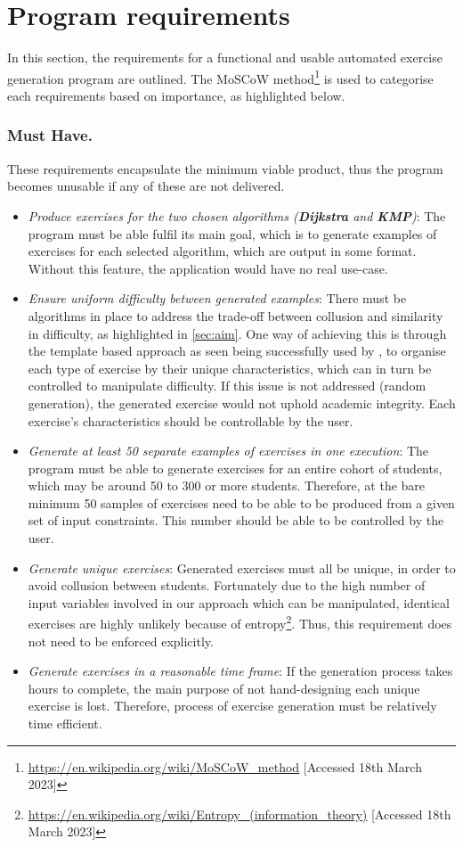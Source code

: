 \documentclass{l4proj}
\begin{document}
\section{Program requirements}

In this section, the requirements for a functional and usable automated exercise generation program are outlined. The MoSCoW method\footnote{\url{https://en.wikipedia.org/wiki/MoSCoW_method} [Accessed 18th March 2023]} is used to categorise each requirements based on importance, as highlighted below.

\subsubsection{Must Have.}

These requirements encapsulate the minimum viable product, thus the program becomes unusable if any of these are not delivered.
\begin{itemize}
	\item
	\emph{Produce exercises for the two chosen algorithms (\textbf{Dijkstra} and \textbf{KMP})}: The program must be able fulfil its main goal, which is to generate examples of exercises for each 		selected algorithm, which are output in some format. Without this feature, the application would have no real use-case. 
	\item
	\emph{Ensure uniform difficulty between generated examples}: There must be algorithms in place to address the trade-off between collusion and similarity in difficulty, as highlighted in \autoref{sec:aim}. One way of achieving this is through the template based approach as seen being successfully used by \cite{Sad12}, to organise each type of exercise by their unique characteristics, which can in turn be controlled to manipulate difficulty. If this issue is not addressed (random generation), the generated exercise would not uphold academic integrity. Each exercise's characteristics should be controllable by the user.
	\item
	\emph{Generate at least 50 separate examples of exercises in one execution}: The program must be able to generate exercises for an entire cohort of students, which may be around 50 to 300 or more students. Therefore, at the bare minimum 50 samples of exercises need to be able to be produced from a given set of input constraints. This number should be able to be controlled by the user.
	\item
	\emph{Generate unique exercises}: Generated exercises must all be unique, in order to avoid collusion between students. Fortunately due to the high number of input variables involved in our approach which can be manipulated, identical exercises are highly unlikely because of entropy\footnote{\url{https://en.wikipedia.org/wiki/Entropy_(information_theory)} [Accessed 18th March 2023]}. Thus, this requirement does not need to be enforced explicitly.
	\item
	\emph{Generate exercises in a reasonable time frame}: If the generation process takes hours to complete, the main purpose of not hand-designing each unique exercise is lost. Therefore, process of exercise generation must be relatively time efficient. 
\end{itemize}
\end{document}
